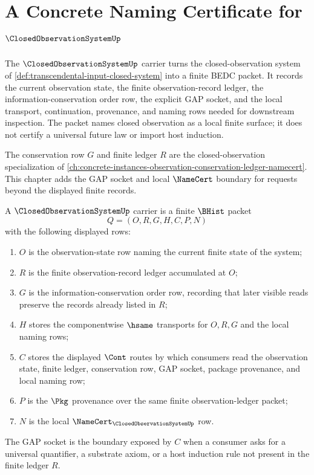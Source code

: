 \chapter{A Concrete Naming Certificate for $\ClosedObservationSystemUp$}
\label{ch:concrete-instances-closedobservationsystem-namecert}

The $\ClosedObservationSystemUp$ carrier turns the closed-observation system of \autoref{def:transcendental-input-closed-system} into a finite BEDC packet. It records the current observation state, the finite observation-record ledger, the information-conservation order row, the explicit GAP socket, and the local transport, continuation, provenance, and naming rows needed for downstream inspection. The packet names closed observation as a local finite surface; it does not certify a universal future law or import host induction.

The conservation row $G$ and finite ledger $R$ are the closed-observation specialization of \autoref{ch:concrete-instances-observation-conservation-ledger-namecert}. This chapter adds the GAP socket and local $\NameCert$ boundary for requests beyond the displayed finite records.

\begin{definition}
\label{def:closed-observation-system-carrier}
A $\ClosedObservationSystemUp$ carrier is a finite $\BHist$ packet
$$
Q=(O,R,G,H,C,P,N)
$$
with the following displayed rows:
\begin{enumerate}
\item $O$ is the observation-state row naming the current finite state of the system;
\item $R$ is the finite observation-record ledger accumulated at $O$;
\item $G$ is the information-conservation order row, recording that later visible reads preserve the records already listed in $R$;
\item $H$ stores the componentwise $\hsame$ transports for $O,R,G$ and the local naming rows;
\item $C$ stores the displayed $\Cont$ routes by which consumers read the observation state, finite ledger, conservation row, GAP socket, package provenance, and local naming row;
\item $P$ is the $\Pkg$ provenance over the same finite observation-ledger packet;
\item $N$ is the local $\NameCert_{\ClosedObservationSystemUp}$ row.
\end{enumerate}
The GAP socket is the boundary exposed by $C$ when a consumer asks for a universal quantifier, a substrate axiom, or a host induction rule not present in the finite ledger $R$.
\end{definition}

